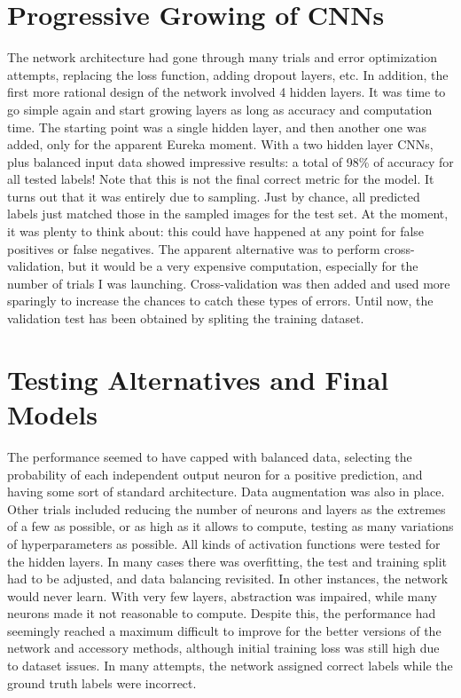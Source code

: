 \documentclass{article}
\begin{document}
\section{Progressive Growing of CNNs}
The network architecture had gone through many trials and error optimization attempts, replacing the loss function, adding dropout layers, etc.
In addition, the first more rational design of the network involved 4 hidden layers.
It was time to go simple again and start growing layers as long as accuracy and computation time.
The starting point was a single hidden layer, and then another one was added, only for the apparent Eureka moment.
With a two hidden layer CNNs, plus balanced input data showed impressive results: a total of 98\% of accuracy for all tested labels!
Note that this is not the final correct metric for the model.
It turns out that it was entirely due to sampling.
Just by chance, all predicted labels just matched those in the sampled images for the test set.
At the moment, it was plenty to think about: this could have happened at any point for false positives or false negatives.
The apparent alternative was to perform cross-validation, but it would be a very expensive computation, especially for the number of trials I was launching.
Cross-validation was then added and used more sparingly to increase the chances to catch these types of errors.
Until now, the validation test has been obtained by spliting the training dataset.


\section{Testing Alternatives and Final Models}
The performance seemed to have capped with balanced data, selecting the probability of each independent output neuron for a positive prediction, and having some sort of standard architecture.
Data augmentation was also in place.
Other trials included reducing the number of neurons and layers as the extremes of a few as possible, or as high as it allows to compute, testing as many variations of hyperparameters as possible.
All kinds of activation functions were tested for the hidden layers.
In many cases there was overfitting, the test and training split had to be adjusted, and data balancing revisited.
In other instances, the network would never learn.
With very few layers, abstraction was impaired, while many neurons made it not reasonable to compute.
Despite this, the performance had seemingly reached a maximum difficult to improve for the better versions of the network and accessory methods, although initial training loss was still high due to dataset issues.
In many attempts, the network assigned correct labels while the ground truth labels were incorrect.
\end{document}

